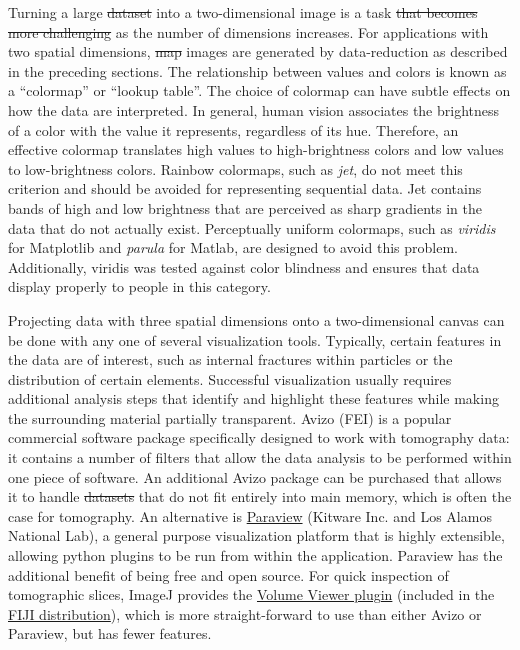 \documentclass[journal=cmatex,manuscript=perspective]{achemso}
\providecommand{\DIFaddtex}[1]{{\protect\color{blue}\uwave{#1}}} %
\providecommand{\DIFdeltex}[1]{{\protect\color{red}\sout{#1}}}                      %
\providecommand{\DIFaddbegin}{} %
\providecommand{\DIFaddend}{} %
\providecommand{\DIFdelbegin}{} %
\providecommand{\DIFdelend}{} %
\providecommand{\DIFadd}[1]{\texorpdfstring{\DIFaddtex{#1}}{#1}} %
\providecommand{\DIFdel}[1]{\texorpdfstring{\DIFdeltex{#1}}{}} %
\begin{document}
Turning a large \DIFdelbegin \DIFdel{dataset }\DIFdelend \DIFaddbegin \DIFadd{data-set }\DIFaddend into a two-dimensional image is a task \DIFdelbegin \DIFdel{that
becomes more challenging }\DIFdelend \DIFaddbegin \DIFadd{of
increasing difficulty }\DIFaddend as the number of dimensions increases. For
applications with two spatial dimensions, \DIFdelbegin \DIFdel{map }\DIFdelend images are generated by
data-reduction as described in the preceding sections. The
relationship between values and colors is known as a ``colormap'' or
``lookup table''. The choice of colormap can have subtle effects on
how the data are interpreted. In general, human vision associates the
brightness of a color with the value it represents, regardless of its
hue. Therefore, an effective colormap translates high values to
high-brightness colors and low values to low-brightness
colors. Rainbow colormaps, such as \emph{jet}, do not meet this
criterion and should be avoided for representing sequential data. Jet
contains bands of high and low brightness that are perceived as sharp
gradients in the data that do not actually exist. Perceptually uniform
colormaps, such as \emph{viridis} for Matplotlib and \emph{parula} for
Matlab, are designed to avoid this problem. Additionally, viridis was
tested against color blindness and ensures that data display properly
to people in this category.

Projecting data with three spatial dimensions onto a two-dimensional
canvas can be done with any one of several visualization
tools. Typically, certain features in the data are of interest, such
as internal fractures within particles or the distribution of certain
elements. Successful visualization usually requires additional
analysis steps that identify and highlight these features while making
the surrounding material partially transparent. Avizo (FEI) is a
popular commercial software package specifically designed to work with
tomography data: it contains a number of filters that allow the data
analysis to be performed within one piece of software. An additional
Avizo package can be purchased that allows it to handle \DIFdelbegin \DIFdel{datasets }\DIFdelend \DIFaddbegin \DIFadd{data-sets }\DIFaddend that
do not fit entirely into main memory, which is often the case for
tomography. An alternative is
\href{http://www.paraview.org/}{Paraview} (Kitware Inc. and Los Alamos
National Lab), a general purpose visualization platform that is highly
extensible, allowing python plugins to be run from within the
application. Paraview has the additional benefit of being free and
open source. For quick inspection of tomographic slices, ImageJ
provides the
\href{https://imagej.nih.gov/ij/plugins/volume-viewer.html}{Volume
  Viewer plugin} (included in the \href{http://imagej.net/Fiji}{FIJI
  distribution}), which is more straight-forward to use than either
Avizo or Paraview, but has fewer features.
\end{document}
